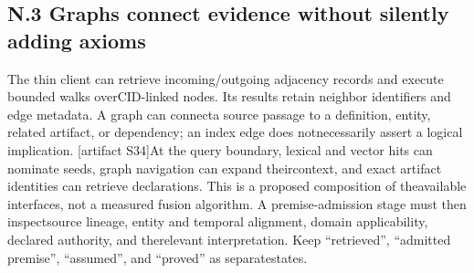 \subsection*{N.3  Graphs connect evidence without silently adding axioms}
\noindent
The thin client can retrieve incoming/outgoing adjacency records and execute bounded walks over\linebreak[4]
CID-linked nodes. Its results retain neighbor identifiers and edge metadata. A graph can connect\linebreak[4]
a source passage to a definition, entity, related artifact, or dependency; an index edge does not\linebreak[4]
necessarily assert a logical implication. [artifact S34]\linebreak[4]
At the query boundary, lexical and vector hits can nominate seeds, graph navigation can expand their\linebreak[4]
context, and exact artifact identities can retrieve declarations. This is a proposed composition of the\linebreak[4]
available interfaces, not a measured fusion algorithm. A premise-admission stage must then inspect\linebreak[4]
source lineage, entity and temporal alignment, domain applicability, declared authority, and the\linebreak[4]
relevant interpretation. Keep ``retrieved'', ``admitted premise'', ``assumed'', and ``proved'' as separate\linebreak[4]
states.\par

